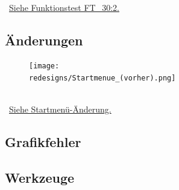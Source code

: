 		~\\\mousecursor~\hyperref[FT:30:Schlaufe]{Siehe Funktionstest FT\_30:2.} 
	
	
\clearpage	
% 



\newpage



\subsection*{Änderungen}



	\begin{figure}[ht]
	
		\label{Abb:Aenderungen:Startmenue_(vorher)}
		\centering

		\texttt{[image: \\redesigns/Startmenue\_(vorher).png]}

	\end{figure}
	
~\\\mousecursor~\hyperref[Abschnitt:Aenderungen:Protokoll:Startmenue]{Siehe Startmenü-Änderung.} 






\subsection*{Grafikfehler}



\newpage



\subsection*{Werkzeuge}



